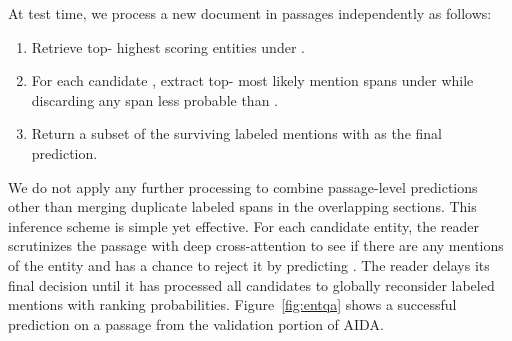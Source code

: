 \documentclass{article} \clearpage{}\usepackage{amsmath,amssymb,amsthm,bbm}
\theoremstyle{definition}
\begin{document}
At test time, we process a new document  in passages  independently as follows:
\begin{enumerate}
\item Retrieve top- highest scoring entities  under .
\item For each candidate , extract top- most likely mention spans  under 
  while discarding any span less probable than .
\item Return a subset of the surviving labeled mentions  with  as the final prediction.
\end{enumerate}
We do not apply any further processing to combine passage-level predictions other than merging duplicate labeled spans  in the overlapping sections.
This inference scheme is simple yet effective.
For each candidate entity, the reader scrutinizes the passage with deep cross-attention to see if there are any mentions of the entity
and has a chance to reject it by predicting .
The reader delays its final decision until it has processed all candidates to globally reconsider labeled mentions with ranking probabilities.
Figure~\ref{fig:entqa} shows a successful prediction on a passage from the validation portion of AIDA.
\end{document}
